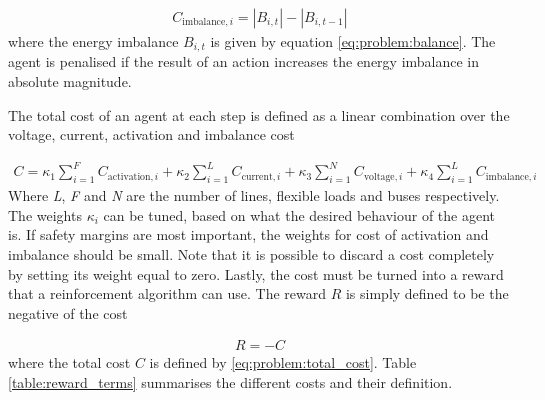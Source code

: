 \documentclass[class=book, crop=false, 11pt]{standalone}
\begin{document}
\begin{equation}
   \begin{aligned}
   \label{eq:problem:balance_cost}
    C_{\textrm{imbalance},i} = |B_{i,t}| - |B_{i,t-1}|
    \end{aligned} 
\end{equation}
where the energy imbalance $B_{i,t}$ is given by equation \eqref{eq:problem:balance}. The agent is penalised if the result of an action increases the energy imbalance in absolute magnitude.  

The total cost of an agent at each step is defined as a linear combination over the voltage, current, activation and imbalance cost 

\begin{equation}
   \begin{aligned}
   \label{eq:problem:total_cost}
    C = 
    \kappa_{1} \sum_{i=1}^{F}C_{\textrm{activation},i} + 
    \kappa_{2} \sum_{i=1}^{L}C_{\textrm{current},i} +
    \kappa_{3} \sum_{i=1}^{N}C_{\textrm{voltage},i} +
    \kappa_{4} \sum_{i=1}^{L}C_{\textrm{imbalance},i} 
    \end{aligned} 
\end{equation}
Where \textit{L}, \textit{F} and \textit{N} are the number of lines, flexible loads and buses respectively. The weights $\kappa_{i}$ can be tuned, based on what the desired behaviour of the agent is. If safety margins are most important, the weights for cost of activation and imbalance should be small. Note that it is possible to discard a cost completely by setting its weight equal to zero. Lastly, the cost must be turned into a reward that a reinforcement algorithm can use. The reward $R$ is simply defined to be the negative of the cost

\begin{equation}
   \begin{aligned}
   \label{eq:problem:total_reward}
    R = - C
    \end{aligned} 
\end{equation}
where the total cost $C$ is defined by \eqref{eq:problem:total_cost}. Table \ref{table:reward_terms} summarises the different costs and their definition. 
\end{document}
